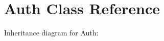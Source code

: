 \hypertarget{class_zest_1_1_auth_1_1_auth}{}\section{Auth Class Reference}
\label{class_zest_1_1_auth_1_1_auth}


Inheritance diagram for Auth\+:
